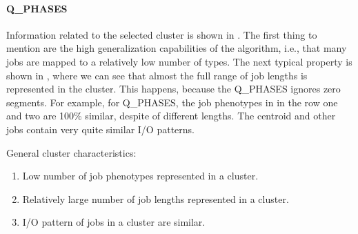 \documentclass{jhps}
\begin{document}
\FloatBarrier
\paragraph{Q\_PHASES}
Information related to the selected cluster is shown in .
The first thing to mention are the high generalization capabilities of the algorithm, i.e., that many jobs are mapped to a relatively low number of types.
The next typical property is shown in , where we can see that almost the full range of job lengths is represented in the cluster.
This happens, because the Q\_PHASES ignores zero segments.
For example, for Q\_PHASES, the job phenotypes in  in the row one and two are 100$\%$ similar, despite of different lengths.
The centroid and other jobs contain very quite similar I/O patterns.

General cluster characteristics:
\begin{enumerate}
 \item Low number of job phenotypes represented in a cluster.
 \item Relatively large number of job lengths represented in a cluster.
 \item I/O pattern of jobs in a cluster are similar.
\end{enumerate}
\end{document}
